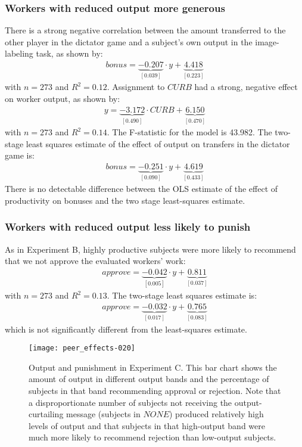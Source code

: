 \documentclass[12pt]{article}
\begin{document}
\subsubsection{Workers with reduced output more generous}
There is a strong negative correlation between the amount transferred
to the other player in the dictator game and a subject's own output in the image-labeling task, as shown by:
\begin{align}
  bonus = \underbrace{-0.207}_{[0.039]} \cdot y +
  \underbrace{4.418}_{[0.223]} \end{align} with
$n = 273$ and $R^2 = 0.12$. Assignment to
$CURB$ had a strong, negative effect on worker output, as shown by:
\begin{align}
  y = \underbrace{-3.172}_{[0.490]}\cdot CURB 
  +  \underbrace{6.150}_{[0.470]} 
\end{align}
with $n = 273$ and $R^2 = 0.14$. The
F-statistic for the model is 43.982. The two-stage least
squares estimate of the effect of output on transfers in the dictator
game is:
\begin{align}
  bonus = \underbrace{-0.251}_{[0.090]} \cdot y +
  \underbrace{4.619}_{[0.433]} \end{align}
There is no detectable difference between the OLS estimate of the
effect of productivity on bonuses and the two stage least-squares
estimate.

\subsubsection{Workers with reduced output less likely to punish} 


As in Experiment B, highly productive subjects were more likely to
recommend that we not approve the evaluated workers' work:
\begin{align}
  approve = \underbrace{-0.042}_{[0.005]}\cdot y + 
\underbrace{0.811}_{[0.037]}
\end{align}
with $n = 273$ and $R^2 = 0.13$. The two-stage least squares estimate is:
\begin{align}
  approve = \underbrace{-0.032}_{[0.017]}\cdot y + 
\underbrace{0.765}_{[0.083]}
\end{align}
which is not significantly different from the least-squares estimate.

\begin{figure} 
  \centering
\texttt{[image: peer\_effects-020]}
\caption{Output and punishment in Experiment
  C\label{fig:ExpC.y.a}. This bar chart shows the amount of output in
  different output bands and the percentage of subjects in that band
  recommending approval or rejection. Note that a disproportionate
  number of subjects not receiving the output-curtailing message
  (subjects in $NONE$) produced relatively high levels of output and
  that subjects in that high-output band were much more likely to
  recommend rejection than low-output subjects.}
\end{figure} 
\end{document}
